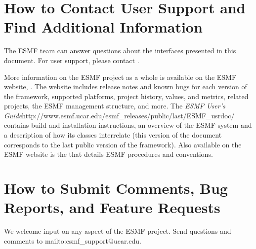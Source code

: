 \section{How to Contact User Support and Find Additional Information}
\label{sec:Support}
The ESMF team can answer questions about the interfaces presented in this 
document.  For user support, please contact 
.  

More information on the ESMF project as a whole is available on the 
ESMF website, .  
The website includes release notes and known bugs for each version of the
framework, supported platforms, project history, values, and metrics, related projects,
the ESMF management structure, and more.  The \htmladdnormallink
{{\it ESMF User's Guide}}{http://www.esmf.ucar.edu/esmf\_releases/public/last/ESMF\_usrdoc/} contains build and installation instructions, an overview of the ESMF system and a description of 
how its classes interrelate (this version of the document corresponds to the last public version of the framework).  Also available on the ESMF website is the 
that details ESMF procedures and conventions.  
 
\section{How to Submit Comments, Bug Reports, and Feature Requests}
\label{sec:Submission}
We welcome input on any aspect of the ESMF project.  Send
questions and comments to 
{mailto:esmf\_support@ucar.edu}.






